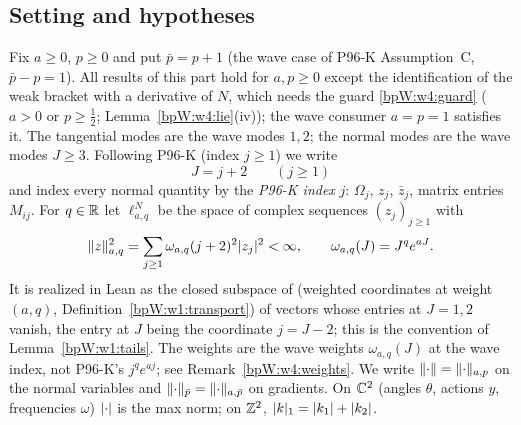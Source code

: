 \subsection{Setting and hypotheses}\label{bpW:w4:setting}

\begin{convention}\label{bpW:w4:index}
Fix $a\ge0$, $p\ge0$ and put $\bar p=p+1$ (the wave case of P96-K Assumption~C, $\bar p-p=1$). All results of this part hold for $a,p\ge0$
except the identification of the weak bracket with a derivative of $N$, which needs the guard \eqref{bpW:w4:guard}
($a>0$ or $p\ge\frac12$; Lemma~\ref{bpW:w4:lie}(iv)); the wave consumer $a=p=1$ satisfies it. The tangential modes
are the wave modes $1,2$; the normal modes are the wave modes $J\ge3$. Following P96-K (index $j\ge1$) we write
\[J=j+2\qquad(j\ge1)\]
and index every normal quantity by the \emph{P96-K index} $j$: $\Omega_j$, $z_j$, $\bar z_j$, matrix entries
$M_{ij}$. For $q\in\mathbb{R}$ let $\ell^N_{a,q}$ be the space of complex sequences $(z_j)_{j\ge1}$ with
\[\lVert z\rVert_{a,q}^2=\sum_{j\ge1}\omega_{a,q}(j+2)^2\lvert z_j\rvert^2<\infty,\qquad\omega_{a,q}(J)=J^qe^{aJ}.\]
It is realized in Lean as the closed subspace of  (weighted coordinates at
weight $(a,q)$, Definition~\ref{bpW:w1:transport}) of vectors whose entries at $J=1,2$ vanish, the entry at $J$
being the coordinate $j=J-2$; this is the convention of Lemma~\ref{bpW:w1:tails}. The weights are the wave weights
$\omega_{a,q}(J)$ at the wave index, not P96-K's $j^qe^{aj}$; see Remark~\ref{bpW:w4:weights}. We write
$\lVert \cdot\rVert=\lVert \cdot\rVert_{a,p}$ on the normal variables and $\lVert \cdot\rVert_{\bar p}=\lVert \cdot\rVert_{a,\bar p}$ on gradients.
On $\mathbb{C}^2$ (angles $\theta$, actions $y$, frequencies $\omega$) $\lvert \cdot\rvert$ is the max norm; on $\mathbb{Z}^2$,
$\lvert k\rvert_1=\lvert k_1\rvert+\lvert k_2\rvert$.


\end{convention}

